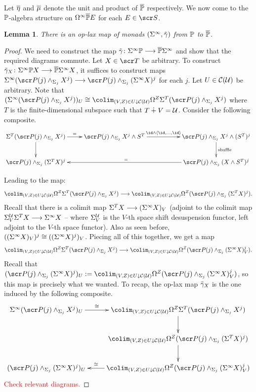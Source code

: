 \documentclass{amsart}
\newtheorem{lem}{Lemma}[section]
\theoremstyle{definition}
\begin{document}
Let $\overline{\eta}$ and $\overline{\mu}$ denote the unit and product of $\overline{\mathbb{P}}$ respectively. We now come to the $\mathbb{P}$-algebra structure on $\Omega^{\infty} \overline{\mathbb{P}} E$ for each $E \in \sS$.

\begin{lem}\label{lem:1.2oplax}
There is an op-lax map of monads $(\Sigma^{\infty},\tilde{\gamma})$ from $\mathbb{P}$ to $\overline{\mathbb{P}}$.
\end{lem}
\begin{proof}
We need to construct the map $\tilde{\gamma} \colon \Sigma^{\infty} \mathbb{P} \longrightarrow \overline{\mathbb{P}}\Sigma^{\infty}$ and show that the required diagrams commute. Let $X \in \sT$ be arbitrary. To construct $\tilde{\gamma}_X \colon \Sigma^{\infty}\mathbb{P} X \longrightarrow \overline{\mathbb{P}} \Sigma^{\infty} X$, it suffices to construct maps $\SI^{\infty}(\sP(j) \sma_{\SI_j} X^j) \rtarr \sP(j) \sma_{\SI_j} (\SI^{\infty}X)^j$ for each $j$. Let $U \in {\mathcal{C}}({\mathcal{U}})$ be arbitrary. Note that $(\SI^{\infty}(\sP(j) \sma_{\SI_j} X^j))_U \iso \colim_{(V,Z) \in U \downarrow \oC(\oU)} \OM^Z \SI^T (\sP(j) \sma_{\SI_j} X^j)$ where $T$ is the finite-dimensional subspace such that $T \dotplus V = {\mathcal{U}}$. Consider the following composite.
\[\xymatrix{
\SI^T(\sP(j)\sma_{\SI_j} X^j) \ar[r]^-{=}\ar[d] & \sP(j) \sma_{\SI_j} X^j \sma S^T  \ar[rr]^-{\id \sma \langle \id, \dots, \id\rangle} & & \sP(j) \sma_{\SI_j} X^j \sma (S^T)^j \ar[d]^{\mathrm{shuffle}} \\
\sP(j) \sma_{\SI_j} (\SI^TX)^j & && \ar[lll]_{=} \sP(j) \sma_{\SI_j} (X \sma S^T)^j
}\] 

\noindent Leading to the map: \[\colim_{(V,Z) \in U \downarrow \oC(\oU)} \OM^Z \SI^T (\sP(j) \sma_{\SI_j} X^j) \rtarr \colim_{(V,Z) \in U \downarrow \oC(\oU)} \OM^Z (\sP(j) \sma_{\SI_j} (\SI^T X)^j).\]
\noindent Recall that there is a colimit map $\Sigma^T X \longrightarrow (\Sigma^{\infty} X)_V$ (adjoint to the colimit map $\Sigma^{{\mathcal{U}}}_{V} \Sigma^T X \longrightarrow \Sigma^{\infty} X$ -- where $\Sigma^{{\mathcal{U}}}_{V}$ is the $V$-th space shift desuspension functor, left adjoint to the $V$-th space functor). Also as seen before, $((\Sigma^{\infty}X)_V)^j \cong ((\Sigma^{\infty} X)^j)_V$. Piecing all of this together, we get a map 
\[\colim_{(V,Z) \in U \downarrow \oC(\oU)} \OM^Z \SI^T (\sP(j) \sma_{\SI_j} X^j) \rtarr \colim_{(V,Z) \in U \downarrow \oC(\oU)} \OM^Z (\sP(j) \sma_{\SI_j} (\SI^\infty X)^j_V).\]
Recall that $(\sP(j) \sma_{\SI_j} (\SI^{\infty}X)^j)_U := \colim_{(V,Z) \in U \downarrow \oC(\oU)} \OM^Z (\sP(j) \sma_{\SI_j} (\SI^\infty X)^j_V)$, so this map is precisely what we wanted. To recap, the op-lax map $\tilde{\gamma}_X$ is the one induced by the following composite.
\[
\xymatrix{
\SI^{\infty} (\sP(j)\sma_{\SI_j}X^j)_U \ar^-{\iso}[r] & \colim_{(V,Z) \in U \downarrow \oC(\oU)} \OM^Z \SI^T (\sP(j) \sma_{\SI_j} X^j) \ar[d]\\
 & \colim_{(V,Z) \in U \downarrow \oC(\oU)} \OM^Z (\sP(j) \sma_{\SI_j} (\SI^T X)^j) \ar[d]\\
(\sP(j) \sma_{\SI_j} (\SI^{\infty}X)^j)_U & \colim_{(V,Z) \in U \downarrow \oC(\oU)} \OM^Z (\sP(j) \sma_{\SI_j} (\SI^{\infty} X)^j_V) \ar[l]_-{\iso}
}
\]
\textcolor{red}{Check relevant diagrams.}
\end{proof}
\end{document}
